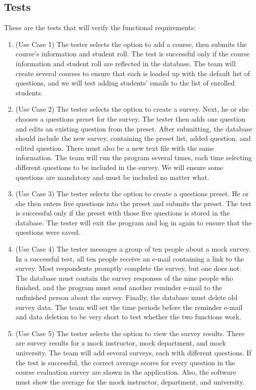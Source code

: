 \documentclass{article}
\begin{document}
\newpage

\subsection{Tests}

These are the tests that will verify the functional requirements:

\begin{enumerate}
  \item (Use Case 1) The tester selects the option to add a course, then submits the course's information and student roll. The test is successful only if the course information and student roll are reflected in the database. The team will create several courses to ensure that each is loaded up with the default list of questions, and we will test adding students' emails to the list of enrolled students.
  \item (Use Case 2) The tester selects the option to create a survey. Next, he or she chooses a questions preset for the survey. The tester then adds one question and edits an existing question from the preset. After submitting, the database should include the new survey, containing the preset list, added question, and edited question. There must also be a new text file with the same information. The team will run the program several times, each time selecting different questions to be included in the survey. We will ensure some questions are mandatory and must be included no matter what.
  \item (Use Case 3) The tester selects the option to create a questions preset. He or she then enters five questions into the preset and submits the preset. The test is successful only if the preset with those five questions is stored in the database. The tester will exit the program and log in again to ensure that the questions were saved.
  \item (Use Case 4) The tester messages a group of ten people about a mock survey. In a successful test, all ten people receive an e-mail containing a link to the survey. Most respondents promptly complete the survey, but one does not. The database must contain the survey responses of the nine people who finished, and the program must send another reminder e-mail to the unfinished person about the survey. Finally, the database must delete old survey data. The team will set the time periods before the reminder e-mail and data deletion to be very short to test whether the two functions work.
  \item (Use Case 5) The tester selects the option to view the survey results. There are survey results for a mock instructor, mock department, and mock university. The team will add several surveys, each with different questions. If the test is successful, the correct average scores for every question in the course evaluation survey are shown in the application. Also, the software must show the average for the mock instructor, department, and university.

\end{enumerate}
\end{document}
